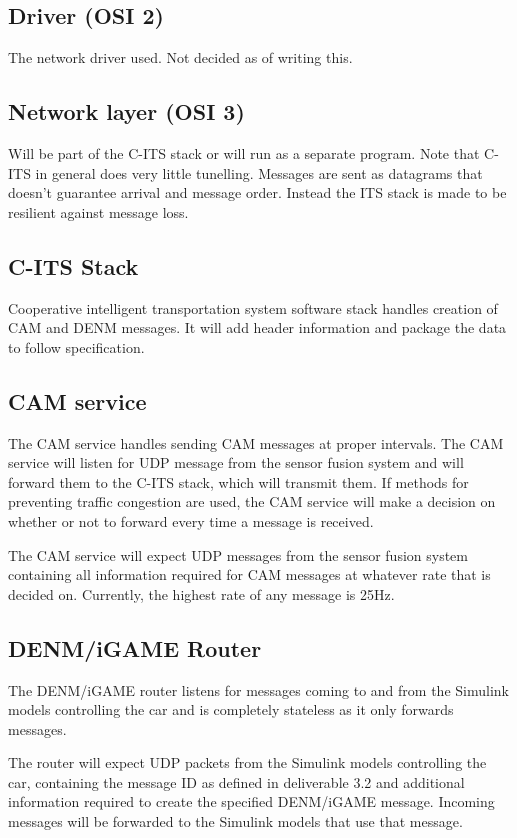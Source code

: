 \documentclass[11pt]{article}
\begin{document}
\subsection{Driver (OSI 2)}
\label{sec-3-2}
The network driver used. Not decided as of writing this.

\subsection{Network layer (OSI 3)}
\label{sec-3-3}
Will be part of the C-ITS stack or will run as a separate program.
Note that C-ITS in general does very little tunelling. Messages are
sent as datagrams that doesn't guarantee arrival and message order.
Instead the ITS stack is made to be resilient against message loss.

\subsection{C-ITS Stack}
\label{sec-3-4}
Cooperative intelligent transportation system software stack handles
creation of CAM and DENM messages. It will add header information and
package the data to follow specification.

\subsection{CAM service}
\label{sec-3-5}
The CAM service handles sending CAM messages at proper intervals. The
CAM service will listen for UDP message from the sensor fusion system
and will forward them to the C-ITS stack, which will transmit them. If
methods for preventing traffic congestion are used, the CAM service
will make a decision on whether or not to forward every time a message
is received.

The CAM service will expect UDP messages from the sensor fusion system
containing all information required for CAM messages at whatever rate
that is decided on. Currently, the highest rate of any message is
25Hz.


\subsection{DENM/iGAME Router}
\label{sec-3-6}
The DENM/iGAME router listens for messages coming to and from the
Simulink models controlling the car and is completely stateless as it
only forwards messages.

The router will expect UDP packets from the Simulink models
controlling the car, containing the message ID as defined in
deliverable 3.2 and additional information required to create the
specified DENM/iGAME message. Incoming messages will be forwarded to
the Simulink models that use that message.
\end{document}
